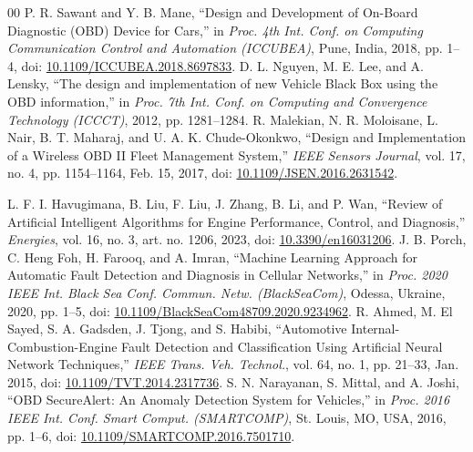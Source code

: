 \documentclass[conference]{IEEEtran}
\begin{document}
\begin{thebibliography}{00}
 P. R. Sawant and Y. B. Mane, ``Design and Development of On-Board Diagnostic (OBD) Device for Cars,'' in \textit{Proc. 4th Int. Conf. on Computing Communication Control and Automation (ICCUBEA)}, Pune, India, 2018, pp. 1--4, doi: \href{https://doi.org/10.1109/ICCUBEA.2018.8697833}{10.1109/ICCUBEA.2018.8697833}.
 D. L. Nguyen, M. E. Lee, and A. Lensky, ``The design and implementation of new Vehicle Black Box using the OBD information,'' in \textit{Proc. 7th Int. Conf. on Computing and Convergence Technology (ICCCT)}, 2012, pp. 1281--1284.
 R. Malekian, N. R. Moloisane, L. Nair, B. T. Maharaj, and U. A. K. Chude-Okonkwo, ``Design and Implementation of a Wireless OBD II Fleet Management System,'' \textit{IEEE Sensors Journal}, vol. 17, no. 4, pp. 1154--1164, Feb. 15, 2017, doi: \href{https://doi.org/10.1109/JSEN.2016.2631542}{10.1109/JSEN.2016.2631542}.

 L. F. I. Havugimana, B. Liu, F. Liu, J. Zhang, B. Li, and P. Wan, ``Review of Artificial Intelligent Algorithms for Engine Performance, Control, and Diagnosis,'' \textit{Energies}, vol. 16, no. 3, art. no. 1206, 2023, doi: \href{https://doi.org/10.3390/en16031206}{10.3390/en16031206}.
 J. B. Porch, C. Heng Foh, H. Farooq, and A. Imran, ``Machine Learning Approach for Automatic Fault Detection and Diagnosis in Cellular Networks,'' in \textit{Proc. 2020 IEEE Int. Black Sea Conf. Commun. Netw. (BlackSeaCom)}, Odessa, Ukraine, 2020, pp. 1--5, doi: \href{https://doi.org/10.1109/BlackSeaCom48709.2020.9234962}{10.1109/BlackSeaCom48709.2020.9234962}.
 R. Ahmed, M. El Sayed, S. A. Gadsden, J. Tjong, and S. Habibi, ``Automotive Internal-Combustion-Engine Fault Detection and Classification Using Artificial Neural Network Techniques,'' \textit{IEEE Trans. Veh. Technol.}, vol. 64, no. 1, pp. 21--33, Jan. 2015, doi: \href{https://doi.org/10.1109/TVT.2014.2317736}{10.1109/TVT.2014.2317736}.
 S. N. Narayanan, S. Mittal, and A. Joshi, ``OBD SecureAlert: An Anomaly Detection System for Vehicles,'' in \textit{Proc. 2016 IEEE Int. Conf. Smart Comput. (SMARTCOMP)}, St. Louis, MO, USA, 2016, pp. 1--6, doi: \href{https://doi.org/10.1109/SMARTCOMP.2016.7501710}{10.1109/SMARTCOMP.2016.7501710}.

\end{thebibliography}
\end{document}
